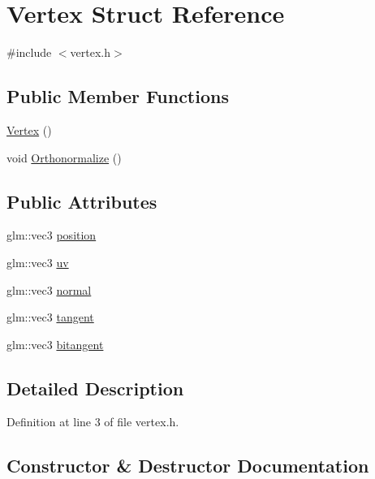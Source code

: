 \hypertarget{struct_vertex}{}\section{Vertex Struct Reference}
\label{struct_vertex}


{\ttfamily \#include $<$vertex.\+h$>$}

\subsection*{Public Member Functions}
\begin{DoxyCompactItemize}
\item 
\hyperlink{struct_vertex_a97488994a2482d70da74e1b91d40e169}{Vertex} ()
\item 
void \hyperlink{struct_vertex_aa89fb006d01315905e0e17bdebf78757}{Orthonormalize} ()
\end{DoxyCompactItemize}
\subsection*{Public Attributes}
\begin{DoxyCompactItemize}
\item 
glm\+::vec3 \hyperlink{struct_vertex_a030819fdc241743bbd3e180a6b132ed3}{position}
\item 
glm\+::vec3 \hyperlink{struct_vertex_a825ca69622b52af1624641fbe6ecc718}{uv}
\item 
glm\+::vec3 \hyperlink{struct_vertex_a3aa35fe84025ecf1acccb5f65f5577fd}{normal}
\item 
glm\+::vec3 \hyperlink{struct_vertex_a89587fd853d4f3f42900715620a7364d}{tangent}
\item 
glm\+::vec3 \hyperlink{struct_vertex_a8c7489e0319ee0b6a214b0753907a80f}{bitangent}
\end{DoxyCompactItemize}


\subsection{Detailed Description}


Definition at line 3 of file vertex.\+h.



\subsection{Constructor \& Destructor Documentation}
\hypertarget{struct_vertex_a97488994a2482d70da74e1b91d40e169}{}
